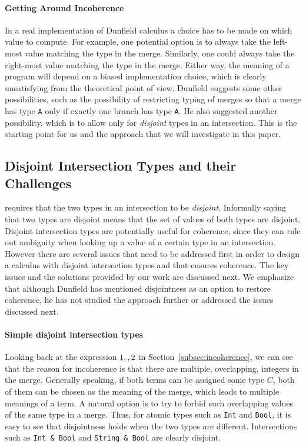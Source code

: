 \paragraph{Getting Around Incoherence}
In a real implementation of Dunfield calculus a choice has to be made
on which value to compute. For example, one potential option is to
always take the left-most value matching the type in the
merge. Similarly, one could always take the right-most value matching
the type in the merge. Either way, the meaning of a program will
depend on a biased implementation choice, which is clearly
unsatisfying from the theoretical point of view.  Dunfield suggests
some other possibilities, such as the possibility of restricting typing
of merges so that a merge has type \lstinline$A$ only if exactly one
branch has type \lstinline$A$. He also suggested another possibility,
which is to allow only for \emph{disjoint} types in an intersection.
This is the starting point for us and the approach that we will 
investigate in this paper. 

\subsection{Disjoint Intersection Types and their Challenges}
\name requires that the
two types in an intersection to be \emph{disjoint}.
Informally saying that two types are disjoint means that the set of
values of both types are disjoint. Disjoint intersection types are
potentially useful for coherence, since they can rule out ambiguity
when looking up a value of a certain type in an intersection. However
there are several issues that need to be addressed first in order to
design a calculus with disjoint intersection types and that ensures
coherence. The key issues and the solutions provided by our work are
discussed next. We emphasize that although Dunfield
has mentioned disjointness as an option to restore coherence, he
has not studied the approach further or addressed the issues discussed next.

\paragraph{Simple disjoint intersection types}
Looking back at the expression $1 ,, 2$ in
Section~\ref{subsec:incoherence}, we can see that the reason for
incoherence is that there are multiple, overlapping, integers in the
merge. Generally speaking, if both terms can be assigned some type
$C$, both of them can be chosen as the meaning of the merge, which
leads to multiple meanings of a term. A natural option is to try
to forbid such overlapping values of the same type in a merge.
Thus, for atomic types such as \lstinline$Int$ and \lstinline$Bool$, it is
easy to see that disjointness holds when the two types are
different. Intersections such as \lstinline$Int & Bool$ and 
\lstinline$String & Bool$ are clearly disjoint.

